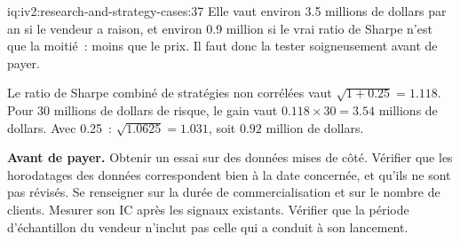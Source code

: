 \begin{solution}{iq:iv2:research-and-strategy-cases:37}
Elle vaut environ 3.5 millions de dollars par an si le vendeur a raison, et environ 0.9 million si le vrai ratio de Sharpe n'est que la moitié~: moins que le prix. Il faut donc la tester soigneusement avant de payer.

Le ratio de Sharpe combiné de stratégies non corrélées vaut $\sqrt{1 + 0.25} = 1.118$. Pour 30 millions de dollars de risque, le gain vaut $0.118 \times 30 = 3.54$ millions de dollars. Avec 0.25~: $\sqrt{1.0625} = 1.031$, soit $0.92$ million de dollars.

\textbf{Avant de payer.} Obtenir un essai sur des données mises de côté. Vérifier que les horodatages des données correspondent bien à la date concernée, et qu'ils ne sont pas révisés. Se renseigner sur la durée de commercialisation et sur le nombre de clients. Mesurer son IC après les signaux existants. Vérifier que la période d'échantillon du vendeur n'inclut pas celle qui a conduit à son lancement.

\end{solution}

